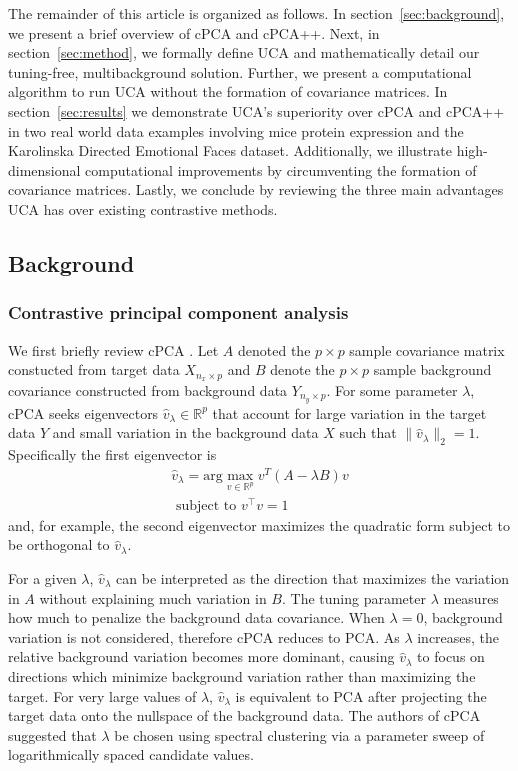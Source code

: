 \documentclass[nocrop]{bioinfo}
\begin{document}
The remainder of this article is organized as follows. In section~\ref{sec:background}, we present a brief overview of cPCA and cPCA++. Next, in section~\ref{sec:method}, we formally define UCA and mathematically detail our tuning-free, multibackground solution. Further, we present a computational algorithm to run UCA without the formation of covariance matrices. In section~\ref{sec:results} we demonstrate UCA's superiority over cPCA and cPCA++ in two real world data examples involving mice protein expression and the Karolinska Directed Emotional Faces dataset. Additionally, we illustrate high-dimensional computational improvements by circumventing the formation of covariance matrices. Lastly, we conclude by reviewing the three main advantages UCA has over existing contrastive methods.

\subsection{Background\label{sec:background}}
\subsubsection{Contrastive principal component analysis }
We first briefly review cPCA \cite{Abid}. Let $A$ denoted the $p\times p$ sample covariance matrix constucted from target data $X_{n_x \times p}$ and $B$ denote the $p\times p$ sample background covariance constructed from background data $Y_{n_y \times p}$. For some parameter $\lambda$, cPCA seeks eigenvectors $\hat{v}_\lambda \in \mathbb{R}^p$ that account for large variation in the target data $Y$ and small variation in the background data $X$ such that $\|\hat{v}_\lambda\|_2 = 1$. Specifically the first eigenvector is
\begin{equation}
  \label{eq:cpca}
  \begin{aligned}
  \hat{v}_\lambda = \text{arg}\max_{v \in \mathbb{R}^p}{v^T\left(A - \lambda B\right)v} \\\mbox{ subject to } v^\top v = 1 
  \end{aligned}
\end{equation}
and, for example, the second eigenvector maximizes the quadratic form subject to be orthogonal to $\hat{v}_\lambda$.

For a given $\lambda$, $\hat{v}_\lambda$ can be interpreted as the direction that maximizes the variation in $A$ without explaining much variation in $B$. The tuning parameter $\lambda$ measures how much to penalize the background data covariance. When $\lambda = 0$, background variation is not considered, therefore cPCA reduces to PCA. As $\lambda$ increases, the relative background variation becomes more dominant, causing $\hat{v}_\lambda$ to focus on directions which minimize background variation rather than maximizing the target. For very large values of $\lambda$, $\hat{v}_\lambda$ is equivalent to PCA after projecting the target data onto the nullspace of the background data.  The authors of cPCA suggested that $\lambda$ be chosen using spectral clustering via a parameter sweep of logarithmically spaced candidate values.
\end{document}
